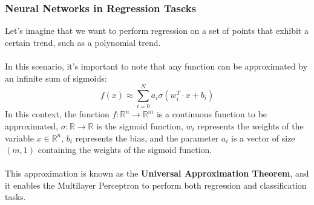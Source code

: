 \documentclass[a4paper, 11pt]{article}
\begin{document}
\subsubsection{Neural Networks in Regression Tascks}
Let's imagine that we want to perform regression on a set of points that exhibit a certain trend, such as a polynomial trend.\\\\
In this scenario, it's important to note that any function can be approximated by an infinite sum of sigmoids:
\begin{equation}
    f(x) \approx \sum_{i = 0}^N a_i\sigma(w^T_i\cdot x + b_i)
\end{equation}
In this context, the function $f:\mathbb{R}^n \rightarrow \mathbb{R}^m$ is a continuous function to be approximated, $\sigma:\mathbb{R} \rightarrow \mathbb{R}$ is the sigmoid function, $w_i$ represents the weights of the variable $x\in\mathbb{R}^n$, $b_i$ represents the bias, and the parameter $a_i$ is a vector of size $(m,1)$ containing the weights of the sigmoid function.\\\\
This approximation is known as the \textbf{Universal Approximation Theorem}, and it enables the Multilayer Perceptron to perform both regression and classification tasks.
\end{document}
